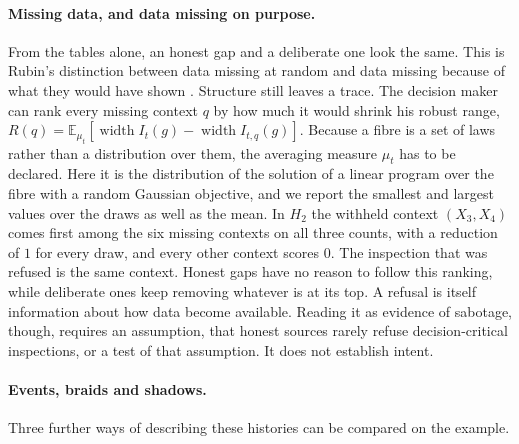 \documentclass[11pt]{article}
\theoremstyle{definition}\newtheorem{definition}[theorem]{Definition}\newtheorem{remark}[theorem]{Remark}\newtheorem{example}[theorem]{Example}\newtheorem{problem}[theorem]{Open problem}\crefname{problem}{Problem}{Problems}
\begin{document}
\paragraph{Missing data, and data missing on purpose.} From the tables alone, an honest gap and a deliberate one look the same. This is Rubin's distinction between data missing at random and data missing because of what they would have shown \cite{Rubin1976}. Structure still leaves a trace. The decision maker can rank every missing context $q$ by how much it would shrink his robust range, $R(q)=\mathbb E_{\mu_t}[\operatorname{width}I_t(g)-\operatorname{width}I_{t,q}(g)]$. Because a fibre is a set of laws rather than a distribution over them, the averaging measure $\mu_t$ has to be declared. Here it is the distribution of the solution of a linear program over the fibre with a random Gaussian objective, and we report the smallest and largest values over the draws as well as the mean. In $H_2$ the withheld context $(X_3,X_4)$ comes first among the six missing contexts on all three counts, with a reduction of $1$ for every draw, and every other context scores $0$. The inspection that was refused is the same context. Honest gaps have no reason to follow this ranking, while deliberate ones keep removing whatever is at its top. A refusal is itself information about how data become available. Reading it as evidence of sabotage, though, requires an assumption, that honest sources rarely refuse decision-critical inspections, or a test of that assumption. It does not establish intent.

\paragraph{Events, braids and shadows.} Three further ways of describing these histories can be compared on the example.
\end{document}
